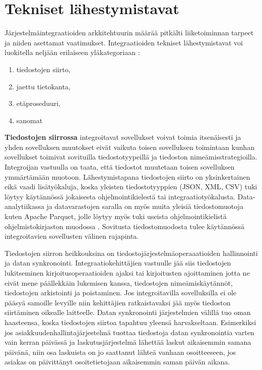 \section{Tekniset lähestymistavat} \label{Tekniset lähestymistavat}

Järjestelmäintegraatioiden arkkitehtuurin määrää pitkälti liiketoiminnan tarpeet ja niiden asettamat vaatimukset. Integraatioiden tekniset lähestymistavat voi luokitella neljään erilaiseen yläkategoriaan \citep[sivu~64]{Hohpe2004}:

\begin{enumerate}
   \item tiedostojen siirto,
   \item jaettu tietokanta,
   \item etäproseduuri,
   \item sanomat
   
\end{enumerate}

\textbf{Tiedostojen siirrossa} integroitavat sovellukset voivat toimia itsenäisesti ja yhden sovelluksen muutokset eivät vaikuta toisen sovelluksen toimintaan kunhan sovellukset toimivat sovituilla tiedostotyypeillä ja tiedoston nimeämisstrategioilla. Integroijan vastuulla on taata, että tiedostot muutetaan toisen sovelluksen ymmärtämään muotoon. Lähestymistapana tiedostojen siirto on yksinkertainen eikä vaadi lisätyökaluja, koska yleisten tiedostotyyppien (JSON, XML, CSV) tuki löytyy käytännössä jokaisesta ohjelmointikielestä tai integraatiotyökalusta.
Data-analytiikassa ja datavarastojen saralla on myös muita yleisiä tiedostomuotoja kuten Apache Parquet, jolle löytyy myös tuki useista ohjelmointikielistä ohjelmistokirjaston muodossa \citep{Parquet}.
Sovitusta tiedostomuodosta tulee käytännössä integroitavien sovellusten välinen rajapinta.

Tiedostojen siirron heikkouksina on tiedostojärjestelmäoperaaatioiden hallinnointi ja datan synkronointi.
Integraatiokehittäjien vastuulle jää siis tiedostojen lukitseminen kirjoitusoperaatioiden ajaksi tai kirjoitusten ajoittaminen jotta ne eivät mene päällekkäin lukemisen kanssa, tiedostojen nimeämiskäytännöt, tiedostojen arkistointi ja poistaminen. Jos integroitavilla sovelluksilla ei ole pääsyä samoille levyille niin kehittäjien ratkaistavaksi jää myös tiedoston siirtäminen oikealle laitteelle.
Datan synkronointi järjestelmien välillä tuo oman haasteensa, koska tiedostojen siirtoa tapahtuu yleensä harvakseltaan. Esimerkiksi jos asiakkuudenhallintajärjestelmä tuottaa tiedostoja datan synkronointia varten vain kerran päivässä ja laskutusjärjestelmä lähettää laskut aikaisemmin samana päivänä, niin osa laskuista on jo saattanut lähteä vanhaan osoitteeseen, jos asiakas on päivittänyt osoitetietojaan aikaisemmin saman päivän aikana.


